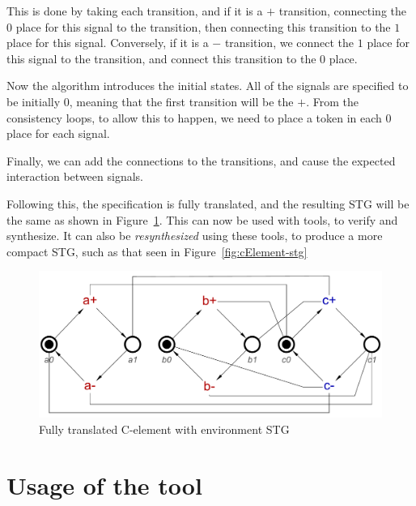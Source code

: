 \documentclass[british,conference,compsoc]{IEEEtran}
\begin{document}
This is done by taking each transition, and if it is a $+$ transition, 
connecting the $0$ place for this signal to the transition, then connecting 
this transition to the $1$ place for this signal. Conversely, if it is a $-$ 
transition, we connect the $1$ place for this signal to the transition, and 
connect this transition to the $0$ place.

Now the algorithm introduces the initial states. All of the signals are 
specified to be initially 0, meaning that the first transition will be the $+$.
From the consistency loops, to allow this to happen, we need to place a token 
in each $0$ place for each signal.

Finally, we can add the connections to the transitions, and cause the 
expected interaction between signals. 

Following this, the specification is fully translated, and the resulting STG 
will be the same as shown in Figure~\ref{fig:cElement-stg-translated}. 
This can now be used with tools, to verify and synthesize. It can also be
\emph{resynthesized} using these tools, to produce a more compact STG,
such as that seen in Figure~\ref{fig:cElement-stg}

\begin{figure}[h]
\vspace{-4mm}
\begin{centering}
\includegraphics[scale=0.3]{Images/cElement-stg-translated}
\par\end{centering}
\protect\caption{\label{fig:cElement-stg-translated} Fully translated C-element with environment STG}
\vspace{-3mm}
\end{figure}

\vspace{-3mm}

\section{Usage of the tool\label{sec:tool-use}}
\end{document}
